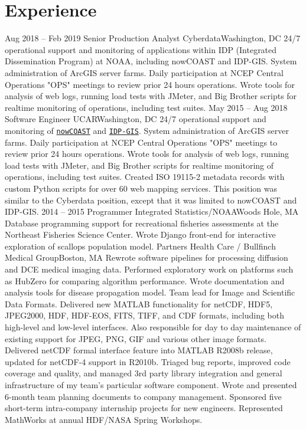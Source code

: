 \documentclass[11pt]{moderncv}  %
\begin{document}
\section{Experience}
\cventry
{Aug 2018 -- Feb 2019}
{Senior Production Analyst}
{Cyberdata}{Washington, DC}{}
{
	24/7 operational support and monitoring of applications within IDP (Integrated Dissemination Program) at NOAA, including nowCOAST and IDP-GIS.  System administration of ArcGIS server farms.  Daily participation at NCEP Central Operations "OPS" meetings to review prior 24 hours operations.  Wrote tools for analysis of web logs, running load tests with JMeter, and Big Brother scripts for realtime monitoring of operations, including test suites.  
}
\cventry
{May 2015 -- Aug 2018}
{Software Engineer}
{UCAR}{Washington, DC}{}
{
	24/7 operational support and monitoring of 
	\href{https://nowcoast.noaa.gov}{\texttt{nowCOAST}}
	and
	\href{https://idpgis.ncep.noaa.gov}{\texttt{IDP-GIS}}.
	System administration of ArcGIS server farms.  Daily
	participation at NCEP Central Operations "OPS" meetings to
	review prior 24 hours operations.  Wrote tools for analysis
	of web logs, running load tests with JMeter, and Big Brother
	scripts for realtime monitoring of operations, including
	test suites.  Created ISO 19115-2 metadata records with
	custom Python scripts for over 60 web mapping services.
	This position was similar to the Cyberdata position, except that
	it was limited to nowCOAST and IDP-GIS.
}
\cventry
{2014 -- 2015}
{Programmer}
{Integrated Statistics/NOAA}{Woods Hole, MA}{}
{
    Database programming support for recreational fisheries assessments at the Northeast Fisheries Science Center. Wrote Django front-end for interactive exploration of scallops population model.
}
{
	Partners Health Care / Bullfinch Medical Group}{Boston, MA}{}{
    Rewrote software pipelines for processing diffusion and DCE medical
    imaging data.  Performed exploratory work on platforms such as
    HubZero  for comparing algorithm performance. Wrote documentation
    and analysis tools for disease propagation model.
}
{   
    Team lead for Image and Scientific Data Formats.  Delivered new MATLAB functionality for netCDF, HDF5, JPEG2000, HDF, HDF-EOS, FITS, TIFF, and CDF formats, including both high-level and low-level interfaces.  Also responsible for day to day maintenance of existing support for JPEG, PNG, GIF and various other image formats.  Delivered netCDF formal interface feature into MATLAB R2008b release, updated for netCDF-4 support in R2010b. Triaged bug reports, improved code coverage and quality, and managed 3rd party library integration and general infrastructure of my team's particular software component.  Wrote and presented 6-month team planning documents to company management.  Sponsored five short-term intra-company internship projects for new engineers.  Represented MathWorks at annual HDF/NASA Spring Workshops.
}
\end{document}
